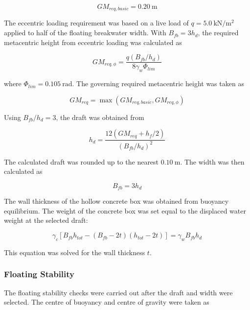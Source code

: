 \documentclass[a4paper, 11pt]{article}
\begin{document}
\begin{equation}
    GM_{req,basic}=0.20~\mathrm{m}
\end{equation}

The eccentric loading requirement was based on a live load of \(q=5.0~\mathrm{kN/m^2}\) applied to half of the floating breakwater width. With \(B_{fb}=3h_d\), the required metacentric height from eccentric loading was calculated as

\begin{equation}
    GM_{req,\phi}=
    \frac{q(B_{fb}/h_d)}
    {8\gamma_w\Phi_{lim}}
\end{equation}

where \(\Phi_{lim}=0.105~\mathrm{rad}\). The governing required metacentric height was taken as

\begin{equation}
    GM_{req}=\max(GM_{req,basic},GM_{req,\phi})
\end{equation}

Using \(B_{fb}/h_d=3\), the draft was obtained from

\begin{equation}
    h_d=
    \frac{12(GM_{req}+h_f/2)}
    {(B_{fb}/h_d)^2}
\end{equation}

The calculated draft was rounded up to the nearest \(0.10~\mathrm{m}\). The width was then calculated as

\begin{equation}
    B_{fb}=3h_d
\end{equation}

The wall thickness of the hollow concrete box was obtained from buoyancy equilibrium. The weight of the concrete box was set equal to the displaced water weight at the selected draft:

\begin{equation}
    \gamma_c\left[B_{fb}h_{tot}-(B_{fb}-2t)(h_{tot}-2t)\right]
    =
    \gamma_w B_{fb}h_d
\end{equation}

This equation was solved for the wall thickness \(t\).

\subsubsection{Floating Stability}

\hspace*{0.5cm} The floating stability checks were carried out after the draft and width were selected. The centre of buoyancy and centre of gravity were taken as
\end{document}
